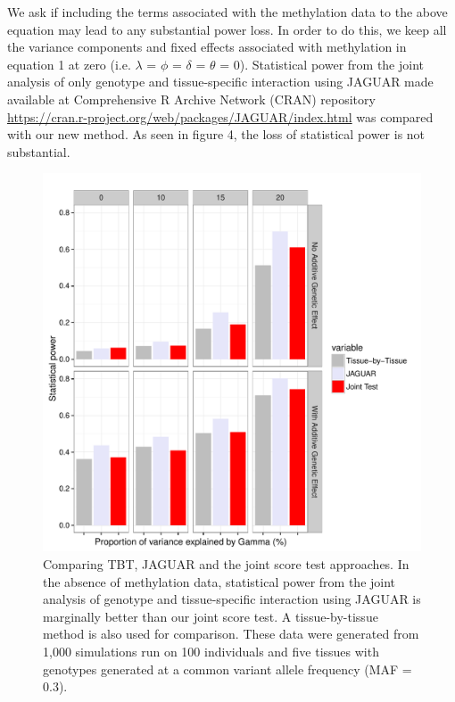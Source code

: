\documentclass[hidelinks]{article}
\begin{document}
We ask if including the terms associated with the methylation data to the above equation may lead to any substantial power loss. In order to do this, we keep all the variance components and fixed effects associated with methylation in equation 1 at zero (i.e. $\lambda$ = $\phi$ = $\delta$ = $\theta$ = 0). Statistical power from the joint analysis of only genotype and tissue-specific interaction using JAGUAR \cite{jaguar_cran} made available at Comprehensive R Archive Network (CRAN) repository \url{https://cran.r-project.org/web/packages/JAGUAR/index.html} was compared with our new method. As seen in figure 4, the loss of statistical power is not substantial. 
\begin{center}
\begin{figure}[!ht]
\includegraphics[width=\textwidth]{JT_JAG_TBT.pdf}
\caption{Comparing TBT, JAGUAR and the joint score test approaches.  In the absence of methylation data, statistical power from the joint analysis of genotype and tissue-specific interaction using JAGUAR is marginally better than our joint score test. A tissue-by-tissue method is also used for comparison. These data were generated from 1,000 simulations run on 100 individuals and five tissues with genotypes generated at a common variant allele frequency (MAF = 0.3).}
\end{figure}
\end{center}
\end{document}
